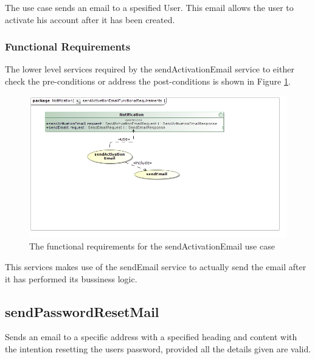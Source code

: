 The use case sends an email to a spesified User. This email allows the user to
activate his account after it has been created.

\subsubsection{Functional Requirements}
The lower level services required by the sendActivationEmail service to either check the
pre-conditions or address the post-conditions is shown in Figure
\ref{sendActivationEmailFunctionalRequirements}.
\begin{figure}[H]
	\begin{center}
		\includegraphics[scale=0.7]{../Diagrams and Charts/Notifications/sendActivationEmailFunctionalRequirements.jpg}
		\caption{The functional requirements for the sendActivationEmail use case}
	\end{center}
	\label{sendActivationEmailFunctionalRequirements}
\end{figure}

This services makes use of the sendEmail service to actually send the email after
it has performed its bussiness logic.

\subsection{sendPasswordResetMail}
Sends an email to a specific address with a specified heading and content
with the intention resetting the users password, provided all the details 
given are valid.

